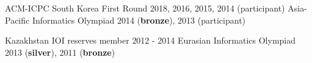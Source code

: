 \documentclass[10pt,a4paper]{altacv}
\begin{document}
    \parbox{0.45\textwidth}{
        \cvachievement
        {}
        {ACM-ICPC South Korea First Round}
        {2018, 2016, 2015, 2014 (participant)}
        \cvachievement
        {\faTrophy}
        {Asia-Pacific Informatics Olympiad}
        {2014 (\textbf{bronze}), 2013 (participant)}}
    \parbox{0.5\textwidth}{
        \cvachievement
        {}
        {Kazakhstan IOI reserves member}
        {2012 - 2014}
        \cvachievement
        {\faTrophy}
        {Eurasian Informatics Olympiad}
        {2013 (\textbf{silver}), 2011 (\textbf{bronze})}}

    \clearpage
\end{document}
